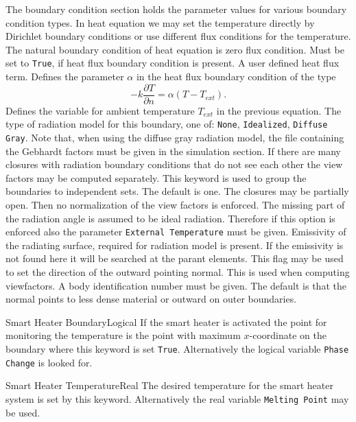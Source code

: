 The boundary condition section holds the parameter values for various
boundary condition types. In heat equation we may set the temperature directly 
by Dirichlet boundary conditions or use different flux conditions for the temperature.
The natural boundary condition of heat equation is zero flux condition.
\sifbegin
{}
Must be set to {\tt True},  if heat flux boundary
condition is present.
 A user defined heat flux term.
Defines the parameter $\alpha$ in the heat flux boundary
condition of the type
$$
    -k\frac{\partial T}{\partial n} = \alpha(T-T_{ext}) .
$$
Defines the variable for ambient temperature $T_{ext}$ in the previous equation.
The type of radiation model for this boundary,
one of: {\tt None}, {\tt Idealized}, {\tt Diffuse Gray}. 
Note that, when using the diffuse gray radiation model, the file containing
the Gebhardt factors must be given in the simulation section.
If there are many closures with radiation boundary conditions that do not
see each other the view factors may be computed separately. This keyword
is used to group the boundaries to independent sets. The default is one.
The closures may be partially open. Then no normalization of the view factors
is enforced. The missing part of the radiation angle is assumed to be 
ideal radiation. Therefore if this option is enforced also 
the parameter \texttt{External Temperature} must be given. 
%
Emissivity of the radiating surface, required for radiation model is present.
If the emissivity is not found here it will be searched at the parant elements. 
This flag may be used to set the
direction of the outward pointing normal. This is used when computing viewfactors.
A body identification number must be given.  The default is that the normal points to less
dense material or outward on outer boundaries.
%
\item{Smart Heater Boundary}{Logical}
If the smart heater is activated the point for monitoring the temperature is 
the point with maximum $x$-coordinate on the boundary where this 
keyword is set \texttt{True}. Alternatively the logical variable \texttt{Phase Change}
is looked for. 
\item{Smart Heater Temperature}{Real}
The desired temperature for the smart heater system is set by this keyword. 
Alternatively the real variable \texttt{Melting Point} may be used. 
\sifend
\sifend


